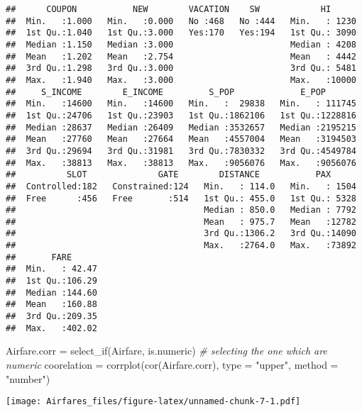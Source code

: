 \documentclass[]{article}
\newenvironment{Shaded}{\begin{snugshade}}{\end{snugshade}}
\newcommand{\AttributeTok}[1]{\textcolor[rgb]{0.77,0.63,0.00}{#1}}
\newcommand{\CommentTok}[1]{\textcolor[rgb]{0.56,0.35,0.01}{\textit{#1}}}
\newcommand{\FunctionTok}[1]{\textcolor[rgb]{0.00,0.00,0.00}{#1}}
\newcommand{\NormalTok}[1]{#1}
\newcommand{\OtherTok}[1]{\textcolor[rgb]{0.56,0.35,0.01}{#1}}
\newcommand{\SpecialCharTok}[1]{\textcolor[rgb]{0.00,0.00,0.00}{#1}}
\newcommand{\StringTok}[1]{\textcolor[rgb]{0.31,0.60,0.02}{#1}}
\begin{document}
\begin{verbatim}
##      COUPON           NEW        VACATION    SW            HI       
##  Min.   :1.000   Min.   :0.000   No :468   No :444   Min.   : 1230  
##  1st Qu.:1.040   1st Qu.:3.000   Yes:170   Yes:194   1st Qu.: 3090  
##  Median :1.150   Median :3.000                       Median : 4208  
##  Mean   :1.202   Mean   :2.754                       Mean   : 4442  
##  3rd Qu.:1.298   3rd Qu.:3.000                       3rd Qu.: 5481  
##  Max.   :1.940   Max.   :3.000                       Max.   :10000  
##     S_INCOME        E_INCOME         S_POP             E_POP        
##  Min.   :14600   Min.   :14600   Min.   :  29838   Min.   : 111745  
##  1st Qu.:24706   1st Qu.:23903   1st Qu.:1862106   1st Qu.:1228816  
##  Median :28637   Median :26409   Median :3532657   Median :2195215  
##  Mean   :27760   Mean   :27664   Mean   :4557004   Mean   :3194503  
##  3rd Qu.:29694   3rd Qu.:31981   3rd Qu.:7830332   3rd Qu.:4549784  
##  Max.   :38813   Max.   :38813   Max.   :9056076   Max.   :9056076  
##          SLOT              GATE        DISTANCE           PAX       
##  Controlled:182   Constrained:124   Min.   : 114.0   Min.   : 1504  
##  Free      :456   Free       :514   1st Qu.: 455.0   1st Qu.: 5328  
##                                     Median : 850.0   Median : 7792  
##                                     Mean   : 975.7   Mean   :12782  
##                                     3rd Qu.:1306.2   3rd Qu.:14090  
##                                     Max.   :2764.0   Max.   :73892  
##       FARE       
##  Min.   : 42.47  
##  1st Qu.:106.29  
##  Median :144.60  
##  Mean   :160.88  
##  3rd Qu.:209.35  
##  Max.   :402.02
\end{verbatim}

\begin{Shaded}
\begin{Highlighting}[]
\NormalTok{Airfare.corr }\OtherTok{=} \FunctionTok{select\_if}\NormalTok{(Airfare, is.numeric) }\CommentTok{\# selecting the one which are numeric}
\NormalTok{coorelation }\OtherTok{=} \FunctionTok{corrplot}\NormalTok{(}\FunctionTok{cor}\NormalTok{(Airfare.corr), }\AttributeTok{type =} \StringTok{"upper"}\NormalTok{, }\AttributeTok{method =} \StringTok{"number"}\NormalTok{)}
\end{Highlighting}
\end{Shaded}

\texttt{[image: Airfares\_files/figure-latex/unnamed-chunk-7-1.pdf]}

\begin{Shaded}
\end{Shaded}
\end{document}
